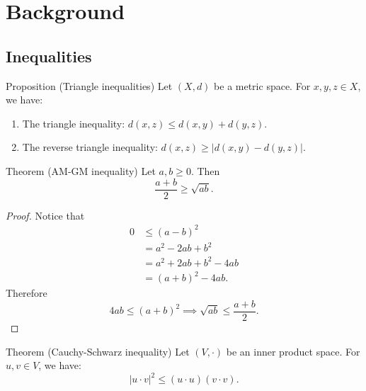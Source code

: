 \section{Background}\label{p:background}

\subsection{Inequalities}
\begin{thmbox}{Proposition (Triangle inequalities)}
    Let $(X,d)$ be a metric space. For $x,y,z \in X$, we have:
    \begin{enumerate}
        \item The triangle inequality: $d(x,z) \leq d(x,y) + d(y,z)$.
        \item The reverse triangle inequality: $d(x,z) \geq |d(x,y) - d(y,z)|$.
    \end{enumerate}
\end{thmbox}

\begin{thmbox}{Theorem (AM-GM inequality)}
    Let $a, b \geq 0$. Then
    $$ \frac{a + b}{2} \geq \sqrt{ab}. $$
\end{thmbox}
\begin{proof}
Notice that
\begin{align*}
    0 &\leq (a - b)^2 \\
    &= a^2 - 2ab + b^2 \\
    &= a^2 + 2ab + b^2 - 4ab \\
    &= (a + b)^2 - 4ab.
\end{align*}
Therefore
$$ 4ab \leq (a + b)^2 \implies \sqrt{ab} \leq \frac{a + b}{2}. $$
\end{proof}

\begin{thmbox}{Theorem (Cauchy-Schwarz inequality)}
    Let $(V,\cdot)$ be an inner product space. For $u, v \in V$, we have:
    $$ |u \cdot v|^2 \leq (u \cdot u)(v \cdot v). $$
\end{thmbox}

